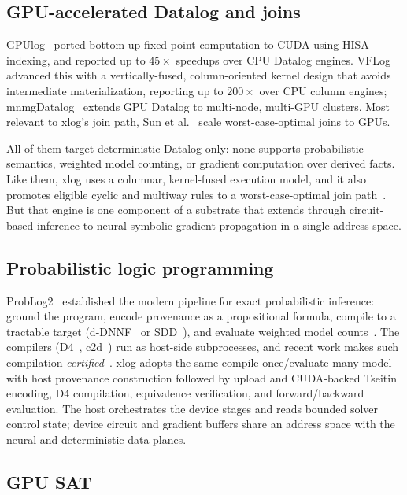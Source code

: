 \subsection{GPU-accelerated Datalog and joins}

GPUlog~\cite{gpulog} ported bottom-up fixed-point computation to CUDA using HISA indexing, and reported up to $45\times$ speedups over CPU Datalog engines. VFLog~\cite{vflog} advanced this with a vertically-fused, column-oriented kernel design that avoids intermediate materialization, reporting up to $200\times$ over CPU column engines; mnmgDatalog~\cite{mnmgdatalog} extends GPU Datalog to multi-node, multi-GPU clusters. Most relevant to xlog's join path, Sun et al.~\cite{sungpuwcoj} scale worst-case-optimal joins to GPUs.

All of them target deterministic Datalog only: none supports probabilistic semantics, weighted model counting, or gradient computation over derived facts. Like them, xlog uses a columnar, kernel-fused execution model, and it also promotes eligible cyclic and multiway rules to a worst-case-optimal join path~\cite{ngo2018wcoj,veldhuizen2014leapfrog,wang2023freejoin}. But that engine is one component of a substrate that extends through circuit-based inference to neural-symbolic gradient propagation in a single address space.

\subsection{Probabilistic logic programming}

ProbLog2~\cite{problog2} established the modern pipeline for exact probabilistic inference: ground the program, encode provenance as a propositional formula, compile to a tractable target (d-DNNF~\cite{darwiche2001dnnf} or SDD~\cite{sdd}), and evaluate weighted model counts~\cite{chaviraDarwiche2008}. The compilers (D4~\cite{d4compiler}, c2d~\cite{c2d}) run as host-side subprocesses, and recent work makes such compilation \emph{certified}~\cite{capelli2019}. xlog adopts the same compile-once/evaluate-many model with host provenance construction followed by upload and CUDA-backed Tseitin encoding, D4 compilation, equivalence verification, and forward/backward evaluation. The host orchestrates the device stages and reads bounded solver control state; device circuit and gradient buffers share an address space with the neural and deterministic data planes.

\subsection{GPU SAT}

